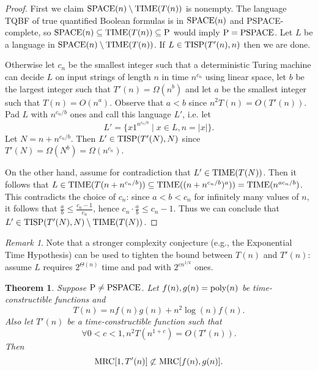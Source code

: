\documentclass[11pt]{article}
\newtheorem{thm}{Theorem}
\theoremstyle{definition}
\theoremstyle{remark}
\newtheorem{remark}{Remark}
\newcommand{\mrc}{\textup{MRC}}
\newcommand{\SPACE}{\textup{SPACE}}
\newcommand{\TIME}{\textup{TIME}}
\newcommand{\TISP}{\textup{TISP}}
\renewcommand{\P}{\textup{P}}
\newcommand{\PSPACE}{\textup{PSPACE}}
\begin{document}
\begin{proof}
First we claim $\SPACE(n) \setminus \TIME(T(n))$ is nonempty. The language TQBF
of true quantified Boolean formulas is in $\SPACE(n)$ and PSPACE-complete, so
$\SPACE(n)\subseteq \TIME(T(n)) \subseteq \P$ would imply $\P=\PSPACE$. Let $L$
be a language in $\SPACE(n)\setminus \TIME(T(n))$. If $L\in \TISP(T'(n),n)$
then we are done.

Otherwise let $c_n$ be the smallest integer such that a deterministic Turing
machine can decide $L$ on input strings of length $n$ in time $n^{c_n}$ using
linear space, let $b$ be the largest integer such that $T'(n)=\Omega(n^b)$ and
let $a$ be the smallest integer such that $T(n)=O(n^a)$.  Observe that $a<b$
since $n^2T(n)=O(T'(n))$.  Pad $L$ with $n^{c_n/b}$ ones and call this language
$L'$, i.e. let $$L'=\{x 1^{n^{c_n/b}} \mid x \in  L, n=|x|\}.$$ Let
$N=n+n^{c_n/b}$. Then $L'\in \TISP(T'(N),N)$ since $T'(N) = \Omega(N^b) =
\Omega(n^{c_n})$.

On the other hand, assume for contradiction that $L'\in \TIME(T(N))$. Then it
follows that $L\in \TIME(T(n+n^{c_n/b}))\subseteq \TIME((n + n^{c_n/b})^a)) =
\TIME(n^{ac_n/b})$.  This contradicts the choice of $c_n$: since $a<b<c_n$ for
infinitely many values of $n$, it follows that $\frac{a}{b}\le
\frac{c_n-1}{c_n}$, hence $c_n\cdot\frac{a}{b}\le c_n-1$.  Thus we can conclude
that $L'\in \TISP(T'(N),N) \setminus \TIME(T(N))$. 

\end{proof}

\begin{remark}
Note that a stronger complexity conjecture (e.g., the Exponential Time
Hypothesis) can be used to tighten the bound between $T(n)$ and $T'(n)$: assume
$L$ requires $2^{\Theta(n)}$ time and pad with $2^{cn^{1/k}}$ ones.  
\end{remark}


\begin{thm} \label{thm:nohierarchy}
Suppose $\P\neq \PSPACE$.  Let $f(n), g(n) = \textup{poly}(n)$ be
time-constructible functions and $$T(n) = nf(n)g(n) + n^2 \log(n)f(n).$$  Also
let $T'(n)$ be a time-constructible function such that $$\forall 0 < c < 1, n^2
T(n^{1+c}) = O(T'(n)).$$ Then $$\mrc[1, T'(n)] \not\subset \mrc[f(n), g(n)].$$
\end{thm}
\end{document}
